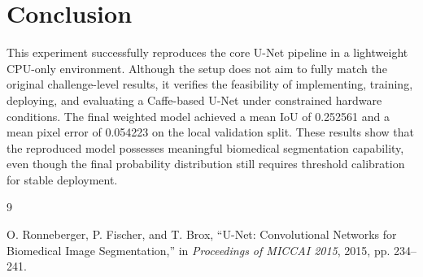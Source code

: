\documentclass[11pt]{article}
\begin{document}
\section{Conclusion}

This experiment successfully reproduces the core U-Net pipeline in a lightweight CPU-only environment. Although the setup does not aim to fully match the original challenge-level results, it verifies the feasibility of implementing, training, deploying, and evaluating a Caffe-based U-Net under constrained hardware conditions. The final weighted model achieved a mean IoU of 0.252561 and a mean pixel error of 0.054223 on the local validation split. These results show that the reproduced model possesses meaningful biomedical segmentation capability, even though the final probability distribution still requires threshold calibration for stable deployment.


\begin{thebibliography}{9}

O. Ronneberger, P. Fischer, and T. Brox,
``U-Net: Convolutional Networks for Biomedical Image Segmentation,''
in \textit{Proceedings of MICCAI 2015}, 2015, pp. 234--241.

\end{thebibliography}
\end{document}
